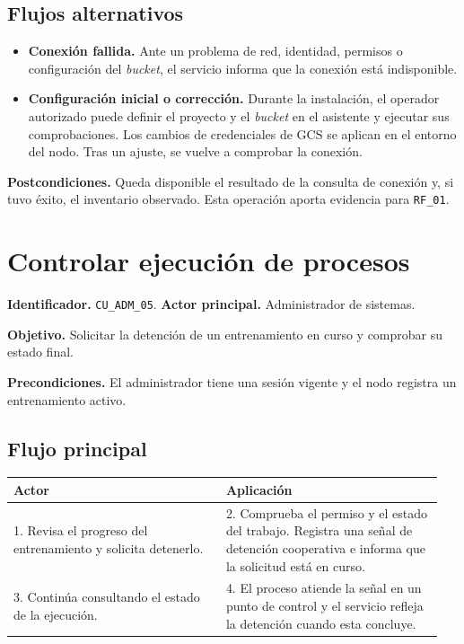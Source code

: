 \subsection*{Flujos alternativos}

\begin{itemize}
    \item \textbf{Conexión fallida.} Ante un problema de red, identidad,
    permisos o configuración del \emph{bucket}, el servicio informa
    que la conexión está indisponible.
    \item \textbf{Configuración inicial o corrección.} Durante la
    instalación, el operador autorizado puede definir el proyecto y
    el \emph{bucket} en el asistente y ejecutar sus comprobaciones.
    Los cambios de credenciales de GCS se aplican en el entorno del
    nodo. Tras un ajuste, se vuelve a comprobar la conexión.
\end{itemize}

\noindent\textbf{Postcondiciones.} Queda disponible el resultado de la
consulta de conexión y, si tuvo éxito, el inventario observado.
Esta operación aporta evidencia para \texttt{RF\_01}.

\section{Controlar ejecución de procesos}
\label{cu:adm-05}

\noindent\textbf{Identificador.} \texttt{CU\_ADM\_05}.
\textbf{Actor principal.} Administrador de sistemas.

\noindent\textbf{Objetivo.} Solicitar la detención de un entrenamiento
en curso y comprobar su estado final.

\noindent\textbf{Precondiciones.} El administrador tiene una sesión
vigente y el nodo registra un entrenamiento activo.

\subsection*{Flujo principal}

\noindent
\begin{tabular}{@{}p{0.47\linewidth}p{0.48\linewidth}@{}}
    \hline
    \textbf{Actor} & \textbf{Aplicación} \\
    \hline
    1. Revisa el progreso del entrenamiento y solicita detenerlo. &
    2. Comprueba el permiso y el estado del trabajo. Registra una señal de detención cooperativa e informa que la solicitud está en curso. \\
    3. Continúa consultando el estado de la ejecución. &
    4. El proceso atiende la señal en un punto de control y el servicio refleja la detención cuando esta concluye. \\
    \hline
\end{tabular}

